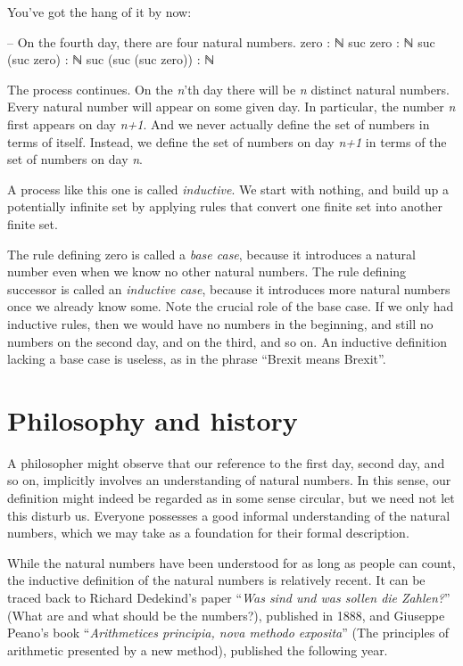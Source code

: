 You've got the hang of it by now:

\begin{myDisplay}
-- On the fourth day, there are four natural numbers.
zero : ℕ
suc zero : ℕ
suc (suc zero) : ℕ
suc (suc (suc zero)) : ℕ
\end{myDisplay}

The process continues. On the \emph{n}'th day there will be \emph{n}
distinct natural numbers. Every natural number will appear on some given
day. In particular, the number \emph{n} first appears on day \emph{n+1}.
And we never actually define the set of numbers in terms of itself.
Instead, we define the set of numbers on day \emph{n+1} in terms of the
set of numbers on day \emph{n}.

A process like this one is called \emph{inductive}. We start with
nothing, and build up a potentially infinite set by applying rules that
convert one finite set into another finite set.

The rule defining zero is called a \emph{base case}, because it
introduces a natural number even when we know no other natural numbers.
The rule defining successor is called an \emph{inductive case}, because
it introduces more natural numbers once we already know some. Note the
crucial role of the base case. If we only had inductive rules, then we
would have no numbers in the beginning, and still no numbers on the
second day, and on the third, and so on. An inductive definition lacking
a base case is useless, as in the phrase ``Brexit means Brexit''.

\hypertarget{philosophy-and-history}{%
\section{Philosophy and history}\label{philosophy-and-history}}

A philosopher might observe that our reference to the first day, second
day, and so on, implicitly involves an understanding of natural numbers.
In this sense, our definition might indeed be regarded as in some sense
circular, but we need not let this disturb us. Everyone possesses a good
informal understanding of the natural numbers, which we may take as a
foundation for their formal description.

While the natural numbers have been understood for as long as people can
count, the inductive definition of the natural numbers is relatively
recent. It can be traced back to Richard Dedekind's paper ``\emph{Was
sind und was sollen die Zahlen?}'' (What are and what should be the
numbers?), published in 1888, and Giuseppe Peano's book
``\emph{Arithmetices principia, nova methodo exposita}'' (The principles
of arithmetic presented by a new method), published the following year.

